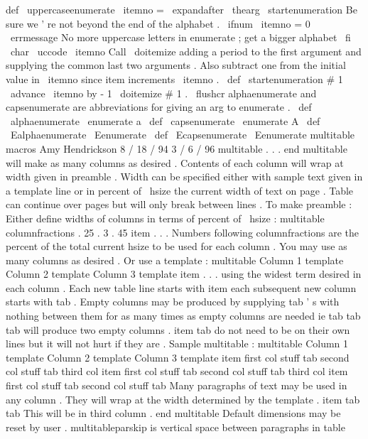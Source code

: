 {{{def
\
uppercaseenumerate
{
%
\
itemno
=
\
expandafter
\
thearg
\
startenumeration
{
%
%
Be
sure
we
'
re
not
beyond
the
end
of
the
alphabet
.
\
ifnum
\
itemno
=
0
\
errmessage
{
No
more
uppercase
letters
in
enumerate
;
get
a
bigger
alphabet
}
\
fi
\
char
\
uccode
\
itemno
}
%
}
%
Call
\
doitemize
adding
a
period
to
the
first
argument
and
supplying
the
%
common
last
two
arguments
.
Also
subtract
one
from
the
initial
value
in
%
\
itemno
since
item
increments
\
itemno
.
%
\
def
\
startenumeration
#
1
{
%
\
advance
\
itemno
by
-
1
\
doitemize
{
#
1
.
}
\
flushcr
}
%
alphaenumerate
and
capsenumerate
are
abbreviations
for
giving
an
arg
%
to
enumerate
.
%
\
def
\
alphaenumerate
{
\
enumerate
{
a
}
}
\
def
\
capsenumerate
{
\
enumerate
{
A
}
}
\
def
\
Ealphaenumerate
{
\
Eenumerate
}
\
def
\
Ecapsenumerate
{
\
Eenumerate
}
%
multitable
macros
%
Amy
Hendrickson
8
/
18
/
94
3
/
6
/
96
%
%
multitable
.
.
.
end
multitable
will
make
as
many
columns
as
desired
.
%
Contents
of
each
column
will
wrap
at
width
given
in
preamble
.
Width
%
can
be
specified
either
with
sample
text
given
in
a
template
line
%
or
in
percent
of
\
hsize
the
current
width
of
text
on
page
.
%
Table
can
continue
over
pages
but
will
only
break
between
lines
.
%
To
make
preamble
:
%
%
Either
define
widths
of
columns
in
terms
of
percent
of
\
hsize
:
%
multitable
columnfractions
.
25
.
3
.
45
%
item
.
.
.
%
%
Numbers
following
columnfractions
are
the
percent
of
the
total
%
current
hsize
to
be
used
for
each
column
.
You
may
use
as
many
%
columns
as
desired
.
%
Or
use
a
template
:
%
multitable
{
Column
1
template
}
{
Column
2
template
}
{
Column
3
template
}
%
item
.
.
.
%
using
the
widest
term
desired
in
each
column
.
%
Each
new
table
line
starts
with
item
each
subsequent
new
column
%
starts
with
tab
.
Empty
columns
may
be
produced
by
supplying
tab
'
s
%
with
nothing
between
them
for
as
many
times
as
empty
columns
are
needed
%
ie
tab
tab
tab
will
produce
two
empty
columns
.
%
item
tab
do
not
need
to
be
on
their
own
lines
but
it
will
not
hurt
%
if
they
are
.
%
Sample
multitable
:
%
multitable
{
Column
1
template
}
{
Column
2
template
}
{
Column
3
template
}
%
item
first
col
stuff
tab
second
col
stuff
tab
third
col
%
item
%
first
col
stuff
%
tab
%
second
col
stuff
%
tab
%
third
col
%
item
first
col
stuff
tab
second
col
stuff
%
tab
Many
paragraphs
of
text
may
be
used
in
any
column
.
%
%
They
will
wrap
at
the
width
determined
by
the
template
.
%
item
tab
tab
This
will
be
in
third
column
.
%
end
multitable
%
Default
dimensions
may
be
reset
by
user
.
%
multitableparskip
is
vertical
space
between
paragraphs
in
table
}}}
